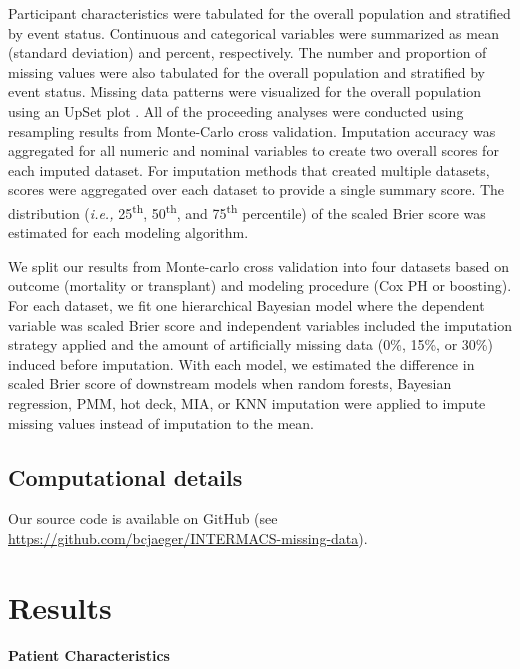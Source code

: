 \documentclass{article}
\begin{document}
Participant characteristics were tabulated for the overall population
and stratified by event status. Continuous and categorical variables
were summarized as mean (standard deviation) and percent, respectively.
The number and proportion of missing values were also tabulated for the
overall population and stratified by event status. Missing data patterns
were visualized for the overall population using an UpSet plot
\cite{lex2014upset}. All of the proceeding analyses were conducted using
resampling results from Monte-Carlo cross validation. Imputation
accuracy was aggregated for all numeric and nominal variables to create
two overall scores for each imputed dataset. For imputation methods that
created multiple datasets, scores were aggregated over each dataset to
provide a single summary score. The distribution
(\textit{i.e., }25\textsuperscript{th}, 50\textsuperscript{th}, and
75\textsuperscript{th} percentile) of the scaled Brier score was
estimated for each modeling algorithm.

We split our results from Monte-carlo cross validation into four
datasets based on outcome (mortality or transplant) and modeling
procedure (Cox PH or boosting). For each dataset, we fit one
hierarchical Bayesian model where the dependent variable was scaled
Brier score and independent variables included the imputation strategy
applied and the amount of artificially missing data (0\%, 15\%, or 30\%)
induced before imputation. With each model, we estimated the difference
in scaled Brier score of downstream models when random forests, Bayesian
regression, PMM, hot deck, MIA, or KNN imputation were applied to impute
missing values instead of imputation to the mean.

\hypertarget{computational-details}{%
\subsection{Computational details}\label{computational-details}}

\label{subsec:computing}

Our source code is available on GitHub (see
\url{https://github.com/bcjaeger/INTERMACS-missing-data}).

\hypertarget{results}{%
\section{Results}\label{results}}

\paragraph{Patient Characteristics}
\end{document}
